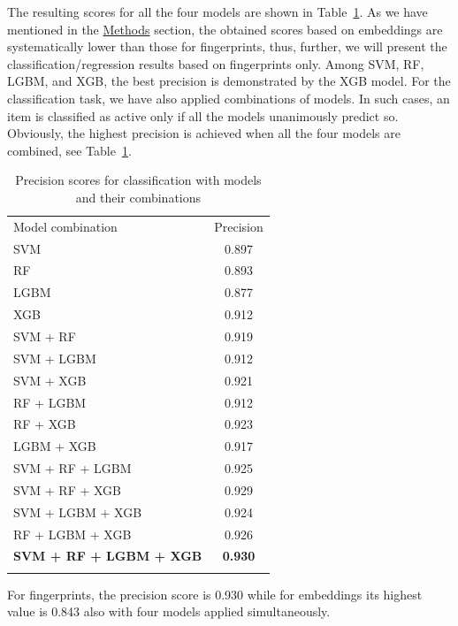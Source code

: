 \documentclass[12pt]{article}
\begin{document}
The resulting scores for all the four models are shown in Table~\ref{tab:class}. 
As we have mentioned in the \hyperref[sec:Methods]{Methods} section, the obtained scores based on embeddings are systematically lower than those for fingerprints, thus, further, we will present the classification/regression results based on fingerprints only.
Among SVM, RF, LGBM, and XGB, the best precision is demonstrated by the XGB model.
For the classification task, we have also applied combinations of models. 
In such cases, an item is classified as active only if all the models unanimously predict so. 
Obviously, the highest precision is achieved when all the four models are combined, see Table~\ref{tab:class}. 
%
\begin{table}
\caption{Precision scores for classification with models and their combinations}\label{tab:class}
\medskip
\centering
\begin{tabular}{lc}
\hline\noalign{\smallskip}
Model combination & Precision \\
\noalign{\smallskip}\hline\noalign{\smallskip}
SVM             & 0.897 \\
RF              & 0.893 \\
LGBM            & 0.877 \\
XGB             & 0.912 \\
SVM + RF        & 0.919\\
SVM + LGBM      & 0.912\\
SVM + XGB       & 0.921\\
RF + LGBM       & 0.912\\
RF + XGB        & 0.923\\
LGBM + XGB      & 0.917\\
SVM + RF + LGBM & 0.925\\
SVM + RF + XGB  & 0.929\\
SVM + LGBM + XGB & 0.924\\
RF + LGBM + XGB & 0.926\\
\cellcolor{lightgray}\textbf{SVM + RF + LGBM + XGB} & \cellcolor{lightgray}\textbf{0.930}\\
\noalign{\smallskip}\hline
\end{tabular}
\end{table}
%
For fingerprints, the precision score is 0.930 while for embeddings its highest value is 0.843 also with four models applied simultaneously.
\end{document}
